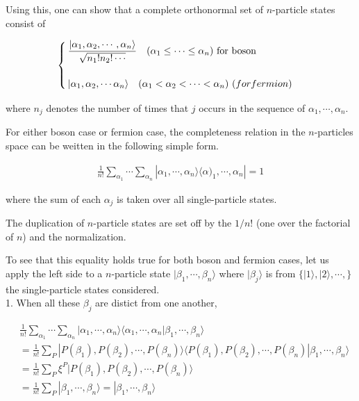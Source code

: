 ﻿\documentclass[twoside]{book}
\numberwithin{equation}{section}
\begin{document}
Using this, one can show that a complete orthonormal set of $n$-particle states consist of

\begin{align}\begin{cases}
\displaystyle\frac{|\alpha_1,\alpha_2,\cdots,\alpha_n\rangle}{\sqrt{n_1!n_2!\cdots}} \quad (\alpha_1\le\cdots\le\alpha_n) \ \text{for boson}\\
\ \\
|\alpha_1,\alpha_2,\cdots\alpha_n\rangle \quad (\alpha_1<\alpha_2<\cdots<\alpha_n)\ \text(for fermion)
\end{cases}\end{align}

where $n_j$ denotes the number of times that $j$ occurs in the sequence of $\alpha_1,\cdots,\alpha_n$. 

For either boson case or fermion case, the completeness relation in the $n$-particles space can be weitten in the following simple form. 

\begin{align}
\frac{1}{n!}\sum_{\alpha_1}\cdots\sum_{\alpha_n}|\alpha_1,\cdots,\alpha_n\rangle\langle\alpha)_1,\cdots,\alpha_n| = 1
\end{align}

where the sum of each $\alpha_j$ is taken over all single-particle states. 

The duplication of $n$-particle states are set off by the $1/n!$ (one over the factorial of $n$) and the normalization. 

To see that this equality holds true for both boson and fermion cases, let us apply the left side to a $n$-particle state $|\beta_1,\cdots,\beta_n\rangle$ where $|\beta_j\rangle$ is from $\{|1\rangle,|2\rangle,\cdots,\}$ the single-particle states considered. \\

{\Huge 1. }When all these $\beta_j$ are distict from one another, 

\[\begin{split}
&\frac{1}{n!}\sum_{\alpha_1}\cdots\sum_{\alpha_n}|\alpha_1,\cdots,\alpha_n\rangle\langle\alpha_1,\cdots,\alpha_n|\beta_1,\cdots,\beta_n\rangle\\
&=\frac{1}{n!}\sum_P|P(\beta_1),P(\beta_2),\cdots,P(\beta_n)\rangle\langle P(\beta_1),P(\beta_2),\cdots,P(\beta_n)|\beta_1,\cdots,\beta_n\rangle\\
&=\frac{1}{n!}\sum_P\xi^P|P(\beta_1),P(\beta_2),\cdots,P(\beta_n)\rangle\\
&=\frac{1}{n!}\sum_P|\beta_1,\cdots,\beta_n\rangle = |\beta_1,\cdots,\beta_n\rangle
\end{split}\]
\end{document}
